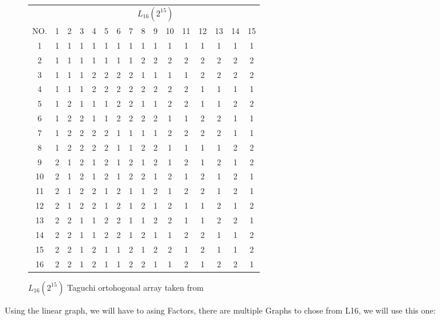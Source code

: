 

\begin{figure}[H]
	\centering
\begin{tabular}{ |c||c|c|c|c|c|c|c|c|c|c|c|c|c|c|c|  }
	\hline
	   & \multicolumn{15}{|c|}{ $L_{16}(2^{15})$ } \\
	NO.& 1 & 2 & 3 & 4 & 5 & 6 & 7 & 8 & 9 & 10& 11& 12& 13& 14&15\\
	\hline
	1  & 1 & 1 & 1 & 1 & 1 & 1 & 1 & 1 & 1 & 1 & 1 & 1 & 1 & 1 & 1\\
	2  & 1 & 1 & 1 & 1 & 1 & 1 & 1 & 2 & 2 & 2 & 2 & 2 & 2 & 2 & 2\\
	3  & 1 & 1 & 1 & 2 & 2 & 2 & 2 & 1 & 1 & 1 & 1 & 2 & 2 & 2 & 2\\
	4  & 1 & 1 & 1 & 2 & 2 & 2 & 2 & 2 & 2 & 2 & 2 & 1 & 1 & 1 & 1\\
	5  & 1 & 2 & 1 & 1 & 1 & 2 & 2 & 1 & 1 & 2 & 2 & 1 & 1 & 2 & 2\\
	6  & 1 & 2 & 2 & 1 & 1 & 2 & 2 & 2 & 2 & 1 & 1 & 2 & 2 & 1 & 1\\
	7  & 1 & 2 & 2 & 2 & 2 & 1 & 1 & 1 & 1 & 2 & 2 & 2 & 2 & 1 & 1\\
	8  & 1 & 2 & 2 & 2 & 2 & 1 & 1 & 2 & 2 & 1 & 1 & 1 & 1 & 2 & 2\\
	9  & 2 & 1 & 2 & 1 & 2 & 1 & 2 & 1 & 2 & 1 & 2 & 1 & 2 & 1 & 2\\
	10 & 2 & 1 & 2 & 1 & 2 & 1 & 2 & 2 & 1 & 2 & 1 & 2 & 1 & 2 & 1\\
	11 & 2 & 1 & 2 & 2 & 1 & 2 & 1 & 1 & 2 & 1 & 2 & 2 & 1 & 2 & 1\\
	12 & 2 & 1 & 2 & 2 & 1 & 2 & 1 & 2 & 1 & 2 & 1 & 1 & 2 & 1 & 2\\
	13 & 2 & 2 & 1 & 1 & 2 & 2 & 1 & 1 & 2 & 2 & 1 & 1 & 2 & 2 & 1\\
	14 & 2 & 2 & 1 & 1 & 2 & 2 & 1 & 2 & 1 & 1 & 2 & 2 & 1 & 1 & 2\\
	15 & 2 & 2 & 1 & 2 & 1 & 1 & 2 & 1 & 2 & 2 & 1 & 2 & 1 & 1 & 2\\
	16 & 2 & 2 & 1 & 2 & 1 & 1 & 2 & 2 & 1 & 1 & 2 & 1 & 2 & 2 & 1\\
	\hline
\end{tabular}
\caption{ $L_{16}(2^{15})$ Taguchi ortohogonal array taken from \cite{roy_primer_1990}}
\end{figure}

Using the linear graph, we will have to asing Factors, there are multiple Graphs to chose from L16, we will use this one:

